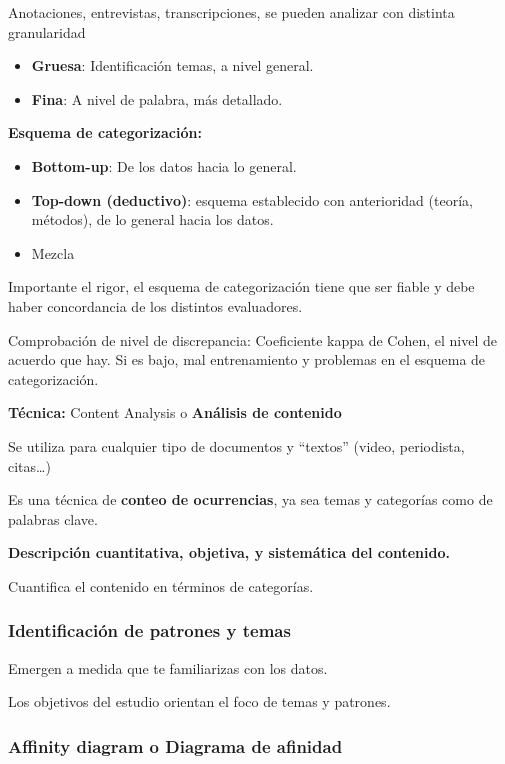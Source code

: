 Anotaciones, entrevistas, transcripciones, se pueden analizar con
distinta granularidad

\begin{itemize}
\tightlist
\item
  \textbf{Gruesa}: Identificación temas, a nivel general.
\item
  \textbf{Fina}: A nivel de palabra, más detallado.
\end{itemize}

\textbf{Esquema de categorización:}

\begin{itemize}
\tightlist
\item
  \textbf{Bottom-up}: De los datos hacia lo general.
\item
  \textbf{Top-down (deductivo)}: esquema establecido con anterioridad
  (teoría, métodos), de lo general hacia los datos.
\item
  Mezcla
\end{itemize}

Importante el rigor, el esquema de categorización tiene que ser fiable y
debe haber concordancia de los distintos evaluadores.

Comprobación de nivel de discrepancia: Coeficiente kappa de Cohen, el
nivel de acuerdo que hay. Si es bajo, mal entrenamiento y problemas en
el esquema de categorización.

\textbf{Técnica:} Content Analysis o \textbf{Análisis de contenido}

Se utiliza para cualquier tipo de documentos y ``textos'' (video,
periodista, citas\ldots)

Es una técnica de \textbf{conteo de ocurrencias}, ya sea temas y
categorías como de palabras clave.

\textbf{Descripción cuantitativa, objetiva, y sistemática del
contenido.}

Cuantifica el contenido en términos de categorías.

\hypertarget{identificaciuxf3n-de-patrones-y-temas}{%
\subsubsection{Identificación de patrones y
temas}\label{identificaciuxf3n-de-patrones-y-temas}}

Emergen a medida que te familiarizas con los datos.

Los objetivos del estudio orientan el foco de temas y patrones.

\hypertarget{affinity-diagram-o-diagrama-de-afinidad}{%
\subsubsection{Affinity diagram o Diagrama de
afinidad}\label{affinity-diagram-o-diagrama-de-afinidad}}

